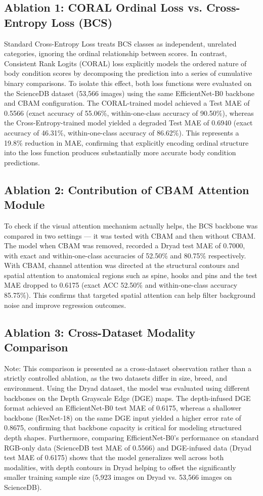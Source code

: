 \subsection{Ablation 1: CORAL Ordinal Loss vs. Cross-Entropy Loss (BCS)}
Standard Cross-Entropy Loss treats BCS classes as independent, unrelated categories, ignoring the ordinal relationship between scores. In contrast, Consistent Rank Logits (CORAL) loss explicitly models the ordered nature of body condition scores by decomposing the prediction into a series of cumulative binary comparisons. To isolate this effect, both loss functions were evaluated on the ScienceDB dataset (53,566 images) using the same EfficientNet-B0 backbone and CBAM configuration. The CORAL-trained model achieved a Test MAE of 0.5566 (exact accuracy of 55.06\%, within-one-class accuracy of 90.50\%), whereas the Cross-Entropy-trained model yielded a degraded Test MAE of 0.6940 (exact accuracy of 46.31\%, within-one-class accuracy of 86.62\%). This represents a 19.8\% reduction in MAE, confirming that explicitly encoding ordinal structure into the loss function produces substantially more accurate body condition predictions.

\subsection{Ablation 2: Contribution of CBAM Attention Module}
To check if the visual attention mechanism actually helps, the BCS backbone was compared in two settings --- it was tested with CBAM and then without CBAM. The model when CBAM was removed, recorded a Dryad test MAE of 0.7000, with exact and within-one-class accuracies of 52.50\% and 80.75\% respectively. With CBAM, channel attention was directed at the structural contours and spatial attention to anatomical regions such as spine, hooks and pins and the test MAE dropped to 0.6175 (exact ACC 52.50\% and within-one-class accuracy 85.75\%). This confirms that targeted spatial attention can help filter background noise and improve regression outcomes.

\subsection{Ablation 3: Cross-Dataset Modality Comparison}
Note: This comparison is presented as a cross-dataset observation rather than a strictly controlled ablation, as the two datasets differ in size, breed, and environment. Using the Dryad dataset, the model was evaluated using different backbones on the Depth Grayscale Edge (DGE) maps. The depth-infused DGE format achieved an EfficientNet-B0 test MAE of 0.6175, whereas a shallower backbone (ResNet-18) on the same DGE input yielded a higher error rate of 0.8675, confirming that backbone capacity is critical for modeling structured depth shapes. Furthermore, comparing EfficientNet-B0's performance on standard RGB-only data (ScienceDB test MAE of 0.5566) and DGE-infused data (Dryad test MAE of 0.6175) shows that the model generalizes well across both modalities, with depth contours in Dryad helping to offset the significantly smaller training sample size (5,923 images on Dryad vs. 53,566 images on ScienceDB).

